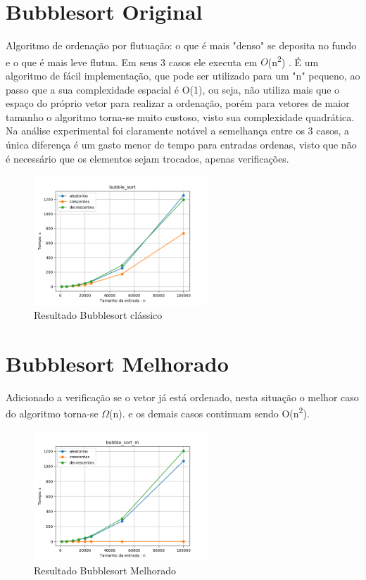\documentclass[10pt,a4paper]{article}
\begin{document}
\section{Bubblesort Original}
    \indent Algoritmo de ordenação por flutuação: o que é mais "denso" se deposita no fundo e o que é mais leve flutua. Em seus 3 casos ele executa em $O$(n\textsuperscript{2}) \cite{owen}. É um algoritmo de fácil implementação, que pode ser utilizado para um "n" pequeno, ao passo que a sua complexidade espacial é O(1), ou seja, não utiliza mais que o espaço do próprio vetor para realizar a ordenação, porém para vetores de maior tamanho o algoritmo torna-se muito custoso, visto sua complexidade quadrática. Na análise experimental foi claramente notável a semelhança entre os 3 casos, a única diferença é um gasto menor de tempo para entradas ordenas, visto que não é necessário que os elementos sejam trocados, apenas verificações.
    \begin{figure}[H]
    	\centering
    	\includegraphics[width=0.58\textwidth]{Resultados/Graficos/bubble_sort.png}
    	\caption{Resultado Bubblesort clássico}
    \end{figure}

\section{Bubblesort Melhorado}
    \indent Adicionado a verificação se o vetor já está ordenado, nesta situação o melhor caso do algoritmo torna-se $\Omega$(n). e os demais casos continuam sendo O(n\textsuperscript{2}).
    \begin{figure}[H]
    	\centering
    	\includegraphics[width=0.58\textwidth]{Resultados/Graficos/bubble_sort_m.png}
    	\caption{Resultado Bubblesort Melhorado}
    \end{figure}
\end{document}
